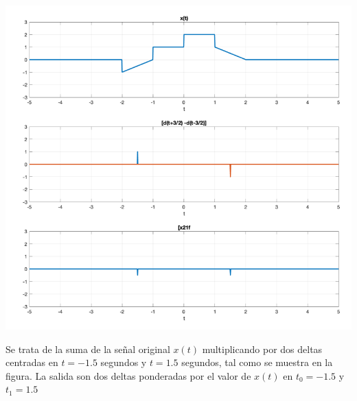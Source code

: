 \begin{enumerate}[label=\color{red}\textbf{\arabic*)}, leftmargin=*]
\begin{enumerate}[label=\color{red}\alph*)]
			\begin{minipage}{0.55\linewidth}
			\includegraphics[width=\linewidth]{"Temas/Tema 1/screenshot009.png"}
			\end{minipage}\qquad\begin{minipage}{0.35\textwidth}
			Se trata de la suma de la señal original $x(t)$ multiplicando por dos deltas centradas en $t=-1.5$ segundos y $t=1.5$ segundos, tal como se muestra en la figura. La salida son dos deltas ponderadas por el valor de $x(t)$ en $t_0=-1.5$ y $t_1=1.5$
			\end{minipage}
			
		\end{enumerate}
\end{enumerate}